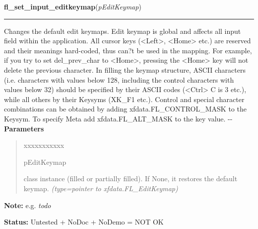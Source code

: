 \hspace{.8\funcindent}\begin{boxedminipage}{\funcwidth}

    \raggedright \textbf{fl\_set\_input\_editkeymap}(\textit{pEditKeymap})

    \vspace{-1.5ex}

    \rule{\textwidth}{0.5\fboxrule}
\setlength{\parskip}{2ex}

Changes the default edit keymaps. Edit keymap is global and affects all
input field within the application. All cursor keys (<Left>, <Home> etc.)
are reserved and their meanings hard-coded, thus can?t be used in the
mapping. For example, if you try to set del\_prev\_char to <Home>, pressing
the <Home> key will not delete the previous character. In filling the
keymap structure, ASCII characters (i.e. characters with values below 128,
including the control characters with values below 32) should be specified
by their ASCII codes (<Ctrl> C is 3 etc.), while all others by their
Keysyms (XK\_F1 etc.). Control and special character combinations can be
obtained by adding xfdata.FL\_CONTROL\_MASK to the Keysym. To specify Meta
add xfdata.FL\_ALT\_MASK to the key value.
-{}-
\setlength{\parskip}{1ex}
      \textbf{Parameters}
      \vspace{-1ex}

      \begin{quote}
        \begin{Ventry}{xxxxxxxxxxx}

          \item[pEditKeymap]


class instance (filled or partially filled). If None, it restores the
default keymap.
            {\it (type=pointer to xfdata.FL\_EditKeymap)}

        \end{Ventry}

      \end{quote}

\textbf{Note:} 
e.g. \emph{todo}


\textbf{Status:} 
Untested + NoDoc + NoDemo = NOT OK


    \end{boxedminipage}



